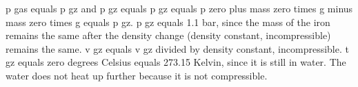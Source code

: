 p gas equals p gz and p gz equals p gz equals p zero plus mass zero times g minus mass zero times g equals p gz. p gz equals 1.1 bar, since the mass of the iron remains the same after the density change (density constant, incompressible) remains the same. v gz equals v gz divided by density constant, incompressible. t gz equals zero degrees Celsius equals 273.15 Kelvin, since it is still in water. The water does not heat up further because it is not compressible.